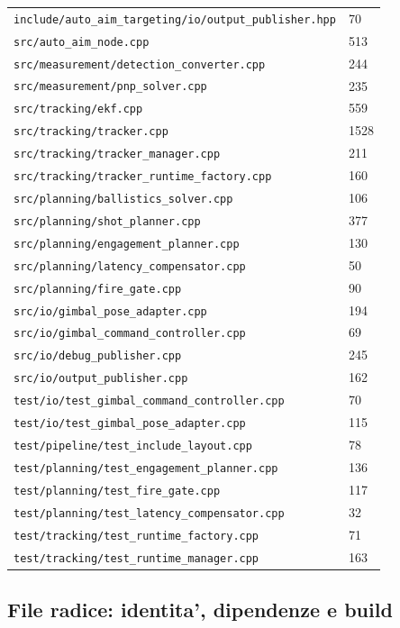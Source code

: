 \documentclass[11pt,a4paper]{article}
\newcommand{\code}[1]{\texttt{#1}}
\begin{document}
\begin{longtable}{p{} p{}}
\code{include/auto\_aim\_targeting/io/output\_publisher.hpp} & 70 \\
\code{src/auto\_aim\_node.cpp} & 513 \\
\code{src/measurement/detection\_converter.cpp} & 244 \\
\code{src/measurement/pnp\_solver.cpp} & 235 \\
\code{src/tracking/ekf.cpp} & 559 \\
\code{src/tracking/tracker.cpp} & 1528 \\
\code{src/tracking/tracker\_manager.cpp} & 211 \\
\code{src/tracking/tracker\_runtime\_factory.cpp} & 160 \\
\code{src/planning/ballistics\_solver.cpp} & 106 \\
\code{src/planning/shot\_planner.cpp} & 377 \\
\code{src/planning/engagement\_planner.cpp} & 130 \\
\code{src/planning/latency\_compensator.cpp} & 50 \\
\code{src/planning/fire\_gate.cpp} & 90 \\
\code{src/io/gimbal\_pose\_adapter.cpp} & 194 \\
\code{src/io/gimbal\_command\_controller.cpp} & 69 \\
\code{src/io/debug\_publisher.cpp} & 245 \\
\code{src/io/output\_publisher.cpp} & 162 \\
\code{test/io/test\_gimbal\_command\_controller.cpp} & 70 \\
\code{test/io/test\_gimbal\_pose\_adapter.cpp} & 115 \\
\code{test/pipeline/test\_include\_layout.cpp} & 78 \\
\code{test/planning/test\_engagement\_planner.cpp} & 136 \\
\code{test/planning/test\_fire\_gate.cpp} & 117 \\
\code{test/planning/test\_latency\_compensator.cpp} & 32 \\
\code{test/tracking/test\_runtime\_factory.cpp} & 71 \\
\code{test/tracking/test\_runtime\_manager.cpp} & 163 \\
\bottomrule
\end{longtable}
\endgroup

\subsection{File radice: identita', dipendenze e build}
\end{document}
